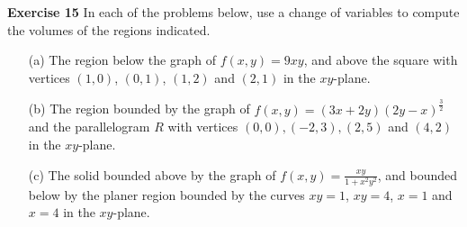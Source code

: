 \documentclass[12pt,oneside]{exam}
\newenvironment{exercise}[1]{\vspace{.1in}\noindent\textbf{Exercise #1 \hspace{.05em}}}{}
\begin{document}
\begin{exercise}{15} 
In each of the problems below, use a change of variables to compute the volumes of the regions indicated. 
\begin{itemize}
\item[(a)] The region below the graph of $f(x,y)=9xy$, and above the square with vertices $(1,0)$, $(0,1)$, $(1,2)$ and $(2,1)$ in the $xy$-plane. 
\item[(b)] The region bounded by the graph of $f(x,y)=(3x+2y)(2y-x)^{\frac{3}{2}}$ and the parallelogram $R$ with vertices $(0,0), (-2,3), (2,5)$ and $(4,2)$ in the $xy$-plane. 
\item[(c)] The solid bounded above by the graph of $f(x,y)=\frac{xy}{1+x^2y^2}$, and bounded below by the planer region bounded by the curves $xy=1$, $xy=4$, $x=1$ and $x=4$ in the $xy$-plane. 
\end{itemize}
\end{exercise}
\end{document}

